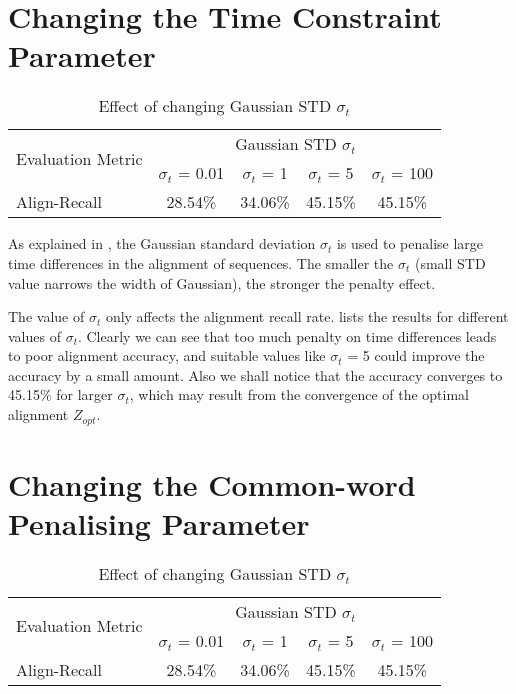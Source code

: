 \section{Changing the Time Constraint Parameter}

\begin{table}[!b]
    \caption{Effect of changing Gaussian STD $\sigma_t$}
    \centering
    \label{tab:eval-res-gauss}
    \begin{tabular}{l c c c c}
    \toprule
    \multirow{2}{*}{Evaluation Metric} & \multicolumn{4}{c}{Gaussian STD $\sigma_t$} \\
    \cmidrule{2-5}
    & $\sigma_t$ = 0.01 & $\sigma_t$ = 1 & $\sigma_t$ = 5 & $\sigma_t$ = 100 \\
    \midrule
    Align-Recall & 28.54\%&34.06\%&45.15\%&45.15\%\\
    \bottomrule
    \end{tabular}
\end{table}

As explained in , the Gaussian standard deviation $\sigma_t$ is used to penalise large time differences in the alignment of sequences. The smaller the $\sigma_t$ (small STD value narrows the width of Gaussian), the stronger the penalty effect.

The value of $\sigma_t$ only affects the alignment recall rate.  lists the results for different values of $\sigma_t$. Clearly we can see that too much penalty on time differences leads to poor alignment accuracy, and suitable values like $\sigma_t$ = 5 could improve the accuracy by a small amount. Also we shall notice that the accuracy converges to 45.15\% for larger $\sigma_t$, which may result from the convergence of the optimal alignment $Z_{opt}$.


\section{Changing the Common-word Penalising Parameter}

\begin{table}[!t]
    \caption{Effect of changing Gaussian STD $\sigma_t$}
    \centering
    \label{tab:eval-res-gauss}
    \begin{tabular}{l c c c c}
    \toprule
    \multirow{2}{*}{Evaluation Metric} & \multicolumn{4}{c}{Gaussian STD $\sigma_t$} \\
    \cmidrule{2-5}
    & $\sigma_t$ = 0.01 & $\sigma_t$ = 1 & $\sigma_t$ = 5 & $\sigma_t$ = 100 \\
    \midrule
    Align-Recall & 28.54\%&34.06\%&45.15\%&45.15\%\\
    \bottomrule
    \end{tabular}
\end{table}



